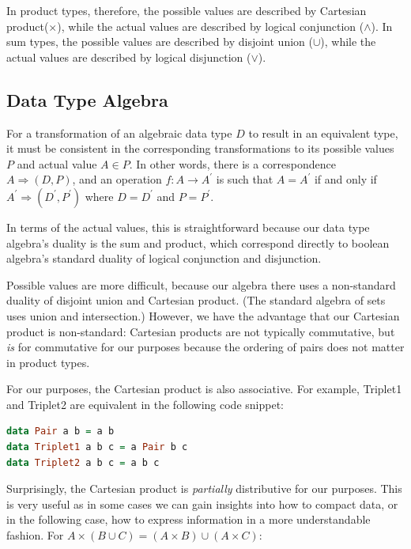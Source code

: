 \documentclass[12pt,a4paper]{article}
\begin{document}
		In product types, therefore, the possible values are described by Cartesian product($\times$), while the actual values are described by logical conjunction ($\land$). In sum types, the possible values are described by disjoint union ($\cup$), while the actual values are described by logical disjunction ($\lor$).
		
		\subsection{Data Type Algebra}
		
		For a transformation of an algebraic data type $D$ to result in an equivalent type, it must be consistent in the corresponding transformations to its possible values $P$ and actual value $A \in P$. In other words, there is a correspondence $A \Rightarrow (D, P)$, and an operation $f: A \to A^\prime$ is such that $A = A^\prime$ if and only if $A^\prime \Rightarrow (D^\prime, P^\prime)$ where $D = D^\prime$ and $P = P^\prime$.
		
		In terms of the actual values, this is straightforward because our data type algebra's duality is the sum and product, which correspond directly to boolean algebra's standard duality of logical conjunction and disjunction.
		
		Possible values are more difficult, because our algebra there uses a non-standard duality of disjoint union and Cartesian product. (The standard algebra of sets uses union and intersection.) However, we have the advantage that our Cartesian product is non-standard: Cartesian products are not typically commutative, but \textit{is} for commutative for our purposes because the ordering of pairs does not matter in product types.
		
		For our purposes, the Cartesian product is also associative. For example, Triplet1 and Triplet2 are equivalent in the following code snippet:
		
		\begin{lstlisting}[language=Haskell]
data Pair a b = a b
data Triplet1 a b c = a Pair b c
data Triplet2 a b c = a b c
		\end{lstlisting}
	
		Surprisingly, the Cartesian product is \textit{partially} distributive for our purposes. This is very useful as in some cases we can gain insights into how to compact data, or in the following case, how to express information in a more understandable fashion. For $ A \times (B \cup C) = (A \times B) \cup (A \times C)$:
	
\end{document}
